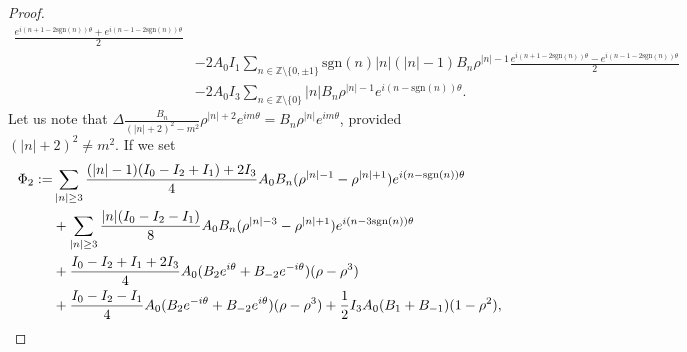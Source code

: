 \documentclass[12pt,reqno]{amsart}
\numberwithin{equation}{section}
\theoremstyle{definition}
\theoremstyle{remark}
\begin{document}
\begin{proof}
\begin{equation*}
\begin{split}
\frac{e^{i(n+1-2\text{sgn}(n))\theta}+e^{i(n-1-2\text{sgn}(n))\theta}}{2}\\
&-2A_0I_1\sum_{n\in\mathbb{Z}\setminus\{0,\pm1\}}\text{sgn}(n)|n|(|n|-1)B_n\rho^{|n|-1}
\frac{e^{i(n+1-2\text{sgn}(n))\theta}-e^{i(n-1-2\text{sgn}(n))\theta}}{2}\\
&-2A_0I_3\sum_{n\in\mathbb{Z}\setminus\{0\}}|n|B_n\rho^{|n|-1}e^{i(n-\text{sgn}(n))\theta}.
\end{split}
\end{equation*}
Let us note that  $ \Delta \frac{B_n}{(|n|+2)^2-m^2}\rho^{|n|+2}e^{im\theta}=B_n\rho^{|n|}e^{im\theta}  $, provided $(|n|+2)^2\ne m^2$. 
If we set  
 \begin{align}\label{eq:Phi2}
 \Phi_2:=&\sum_{|n|\ge3}\frac{(|n|-1)(I_0-I_2+I_1)+2I_3}{4}A_0B_n
 (\rho^{|n|-1}-\rho^{|n|+1})e^{i(n-\text{sgn} (n))\theta}\notag\\
 &+\sum_{|n|\ge3}\frac{|n|(I_0-I_2-I_1)}{8}A_0B_n
 (\rho^{|n|-3}-\rho^{|n|+1})e^{i(n-3\text{sgn} (n))\theta}\notag\\
 &+\frac{I_0-I_2+I_1+2I_3}{4}A_0(B_2e^{i\theta}+B_{-2}e^{-i\theta})(\rho-\rho^3)\notag\\
 &+\frac{I_0-I_2-I_1}{4}A_0(B_2e^{-i\theta}+B_{-2}e^{i\theta})(\rho-\rho^3)
 +\frac12I_3A_0(B_1+B_{-1})(1-\rho^2), 
 \end{align}

\end{proof}
\end{document}
